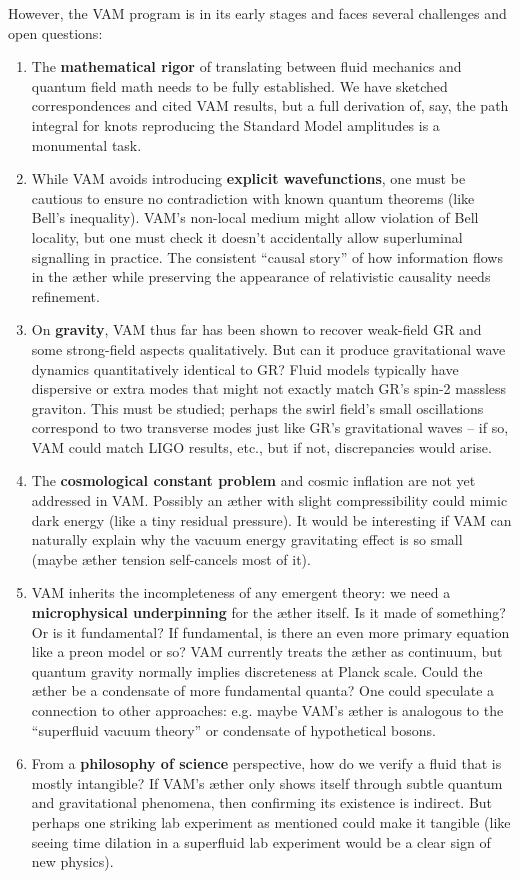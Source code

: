 \documentclass[a4paper,12pt]{article}
\begin{document}
    However, the VAM program is in its early stages and faces several challenges and open questions:
    \begin{enumerate}
        \item The \textbf{mathematical rigor} of translating between fluid mechanics and quantum field math needs to be fully established. We have sketched correspondences and cited VAM results, but a full derivation of, say, the path integral for knots reproducing the Standard Model amplitudes is a monumental task.
        \item While VAM avoids introducing \textbf{explicit wavefunctions}, one must be cautious to ensure no contradiction with known quantum theorems (like Bell’s inequality). VAM’s non-local medium might allow violation of Bell locality, but one must check it doesn’t accidentally allow superluminal signalling in practice. The consistent “causal story” of how information flows in the æther while preserving the appearance of relativistic causality needs refinement.
        \item On \textbf{gravity}, VAM thus far has been shown to recover weak-field GR and some strong-field aspects qualitatively. But can it produce gravitational wave dynamics quantitatively identical to GR? Fluid models typically have dispersive or extra modes that might not exactly match GR’s spin-2 massless graviton. This must be studied; perhaps the swirl field’s small oscillations correspond to two transverse modes just like GR’s gravitational waves – if so, VAM could match LIGO results, etc., but if not, discrepancies would arise.
        \item The \textbf{cosmological constant problem} and cosmic inflation are not yet addressed in VAM. Possibly an æther with slight compressibility could mimic dark energy (like a tiny residual pressure). It would be interesting if VAM can naturally explain why the vacuum energy gravitating effect is so small (maybe æther tension self-cancels most of it).
        \item VAM inherits the incompleteness of any emergent theory: we need a \textbf{microphysical underpinning} for the æther itself. Is it made of something? Or is it fundamental? If fundamental, is there an even more primary equation like a preon model or so? VAM currently treats the æther as continuum, but quantum gravity normally implies discreteness at Planck scale. Could the æther be a condensate of more fundamental quanta? One could speculate a connection to other approaches: e.g. maybe VAM’s æther is analogous to the “superfluid vacuum theory” or condensate of hypothetical bosons.
        \item From a \textbf{philosophy of science} perspective, how do we verify a fluid that is mostly intangible? If VAM’s æther only shows itself through subtle quantum and gravitational phenomena, then confirming its existence is indirect. But perhaps one striking lab experiment as mentioned could make it tangible (like seeing time dilation in a superfluid lab experiment would be a clear sign of new physics).
    \end{enumerate}
\end{document}

